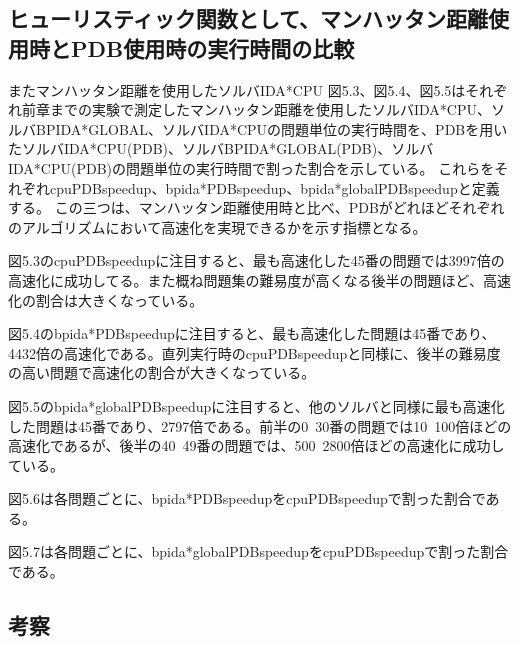 \documentclass[a4paper,11pt,oneside,openany]{jsbook}
\begin{document}
\subsection{ヒューリスティック関数として、マンハッタン距離使用時とPDB使用時の実行時間の比較}






またマンハッタン距離を使用したソルバIDA*CPU
図5.3、図5.4、図5.5はそれぞれ前章までの実験で測定したマンハッタン距離を使用したソルバIDA*CPU、ソルバBPIDA*GLOBAL、ソルバIDA*CPUの問題単位の実行時間を、PDBを用いたソルバIDA*CPU(PDB)、ソルバBPIDA*GLOBAL(PDB)、ソルバIDA*CPU(PDB)の問題単位の実行時間で割った割合を示している。
これらをそれぞれcpuPDBspeedup、bpida*PDBspeedup、bpida*globalPDBspeedupと定義する。
この三つは、マンハッタン距離使用時と比べ、PDBがどれほどそれぞれのアルゴリズムにおいて高速化を実現できるかを示す指標となる。

図5.3のcpuPDBspeedupに注目すると、最も高速化した45番の問題では3997倍の高速化に成功してる。また概ね問題集の難易度が高くなる後半の問題ほど、高速化の割合は大きくなっている。

図5.4のbpida*PDBspeedupに注目すると、最も高速化した問題は45番であり、4432倍の高速化である。直列実行時のcpuPDBspeedupと同様に、後半の難易度の高い問題で高速化の割合が大きくなっている。

図5.5のbpida*globalPDBspeedupに注目すると、他のソルバと同様に最も高速化した問題は45番であり、2797倍である。前半の0~30番の問題では10~100倍ほどの高速化であるが、後半の40~49番の問題では、500~2800倍ほどの高速化に成功している。


図5.6は各問題ごとに、bpida*PDBspeedupをcpuPDBspeedupで割った割合である。

図5.7は各問題ごとに、bpida*globalPDBspeedupをcpuPDBspeedupで割った割合である。




\subsection{考察}
\end{document}
